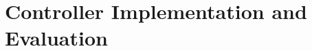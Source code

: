 \documentclass[preprint,authoryear,12pt]{elsarticle}
\begin{document}
\section{Controller Implementation and Evaluation}\label{sec:ControllerImplementationAndEvaluation}








\end{document}
